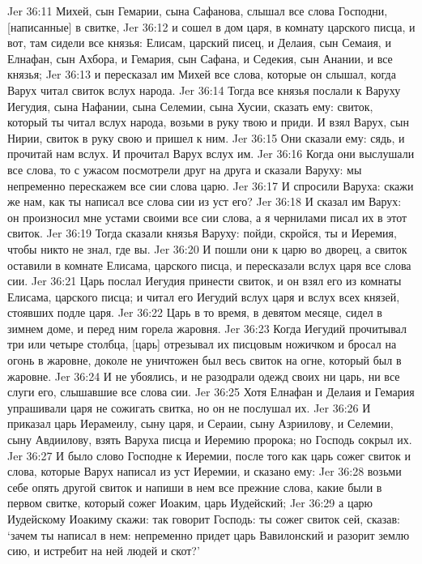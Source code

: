Jer 36:11  Михей, сын Гемарии, сына Сафанова, слышал все слова Господни, [написанные] в свитке,
Jer 36:12  и сошел в дом царя, в комнату царского писца, и вот, там сидели все князья: Елисам, царский писец, и Делаия, сын Семаия, и Елнафан, сын Ахбора, и Гемария, сын Сафана, и Седекия, сын Анании, и все князья;
Jer 36:13  и пересказал им Михей все слова, которые он слышал, когда Варух читал свиток вслух народа.
Jer 36:14  Тогда все князья послали к Варуху Иегудия, сына Нафании, сына Селемии, сына Хусии, сказать ему: свиток, который ты читал вслух народа, возьми в руку твою и приди. И взял Варух, сын Нирии, свиток в руку свою и пришел к ним.
Jer 36:15  Они сказали ему: сядь, и прочитай нам вслух. И прочитал Варух вслух им.
Jer 36:16  Когда они выслушали все слова, то с ужасом посмотрели друг на друга и сказали Варуху: мы непременно перескажем все сии слова царю.
Jer 36:17  И спросили Варуха: скажи же нам, как ты написал все слова сии из уст его?
Jer 36:18  И сказал им Варух: он произносил мне устами своими все сии слова, а я чернилами писал их в этот свиток.
Jer 36:19  Тогда сказали князья Варуху: пойди, скройся, ты и Иеремия, чтобы никто не знал, где вы.
Jer 36:20  И пошли они к царю во дворец, а свиток оставили в комнате Елисама, царского писца, и пересказали вслух царя все слова сии.
Jer 36:21  Царь послал Иегудия принести свиток, и он взял его из комнаты Елисама, царского писца; и читал его Иегудий вслух царя и вслух всех князей, стоявших подле царя.
Jer 36:22  Царь в то время, в девятом месяце, сидел в зимнем доме, и перед ним горела жаровня.
Jer 36:23  Когда Иегудий прочитывал три или четыре столбца, [царь] отрезывал их писцовым ножичком и бросал на огонь в жаровне, доколе не уничтожен был весь свиток на огне, который был в жаровне.
Jer 36:24  И не убоялись, и не разодрали одежд своих ни царь, ни все слуги его, слышавшие все слова сии.
Jer 36:25  Хотя Елнафан и Делаия и Гемария упрашивали царя не сожигать свитка, но он не послушал их.
Jer 36:26  И приказал царь Иерамеилу, сыну царя, и Сераии, сыну Азриилову, и Селемии, сыну Авдиилову, взять Варуха писца и Иеремию пророка; но Господь сокрыл их.
Jer 36:27  И было слово Господне к Иеремии, после того как царь сожег свиток и слова, которые Варух написал из уст Иеремии, и сказано ему:
Jer 36:28  возьми себе опять другой свиток и напиши в нем все прежние слова, какие были в первом свитке, который сожег Иоаким, царь Иудейский;
Jer 36:29  а царю Иудейскому Иоакиму скажи: так говорит Господь: ты сожег свиток сей, сказав: `зачем ты написал в нем: непременно придет царь Вавилонский и разорит землю сию, и истребит на ней людей и скот?'
